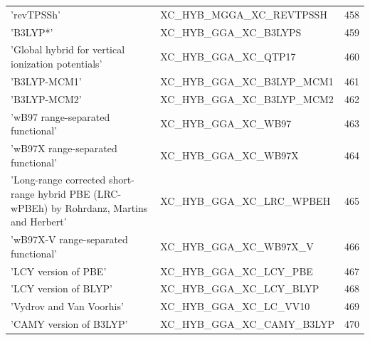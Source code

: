 \documentclass[final,12pt,makeidx,DIV=calc]{article}
\begin{document}
{{{\begin{table}[!h]
\begin{center}
\begin{tabular}{llr}
  'revTPSSh' & XC\_HYB\_MGGA\_XC\_REVTPSSH  &458\\
  'B3LYP*' & XC\_HYB\_GGA\_XC\_B3LYPS  &459\\
  'Global hybrid for vertical ionization potentials' & XC\_HYB\_GGA\_XC\_QTP17  &460\\
  'B3LYP-MCM1' & XC\_HYB\_GGA\_XC\_B3LYP\_MCM1  &461\\
  'B3LYP-MCM2' & XC\_HYB\_GGA\_XC\_B3LYP\_MCM2  &462\\
  'wB97 range-separated functional' & XC\_HYB\_GGA\_XC\_WB97  &463\\
  'wB97X range-separated functional' & XC\_HYB\_GGA\_XC\_WB97X  &464\\
  'Long-range corrected short-range hybrid PBE (LRC-wPBEh) by Rohrdanz, Martins and Herbert' & XC\_HYB\_GGA\_XC\_LRC\_WPBEH  &465\\
  'wB97X-V range-separated functional' & XC\_HYB\_GGA\_XC\_WB97X\_V  &466\\
  'LCY version of PBE' & XC\_HYB\_GGA\_XC\_LCY\_PBE  &467\\
  'LCY version of BLYP' & XC\_HYB\_GGA\_XC\_LCY\_BLYP  &468\\
  'Vydrov and Van Voorhis' & XC\_HYB\_GGA\_XC\_LC\_VV10  &469\\
  'CAMY version of B3LYP' & XC\_HYB\_GGA\_XC\_CAMY\_B3LYP  &470\\
\end{tabular}
\end{center}
\end{table}

}}}
\end{document}
